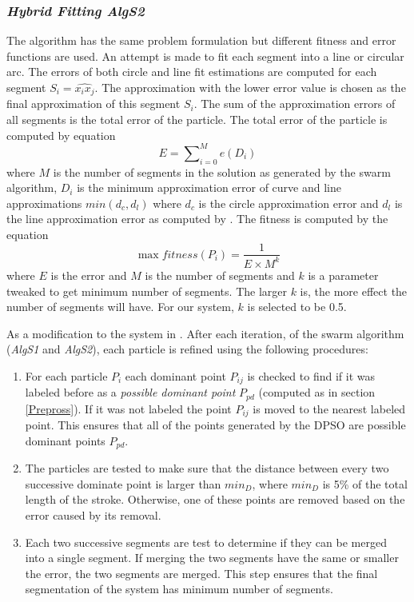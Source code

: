 \documentclass[preprint,1p,times,review]{elsarticle}
\begin{document}
 \subsubsection{\textit{Hybrid Fitting \textsl{AlgS2}}}
The algorithm has the same problem formulation but different fitness and error
functions are used. An attempt is made to fit each segment into a line or
circular arc. The errors of both circle and line fit estimations are computed
for each segment $S_i=\widehat{x_ix_j}$. The approximation with the lower error
value is chosen as the final approximation of this segment
$S_i$\cite{CruveDivisionSwarm}. The sum of the approximation errors of all
segments is the total error of the particle.  The total error of the particle is
computed by equation %
 \begin{equation}
E=\sum\nolimits_{i = 0}^M e(D_i)
\label{eq:errorSwarm2}
\end{equation}where $M$ is the number of segments in the solution as generated
by the swarm algorithm, $D_i$ is the minimum approximation error of curve and
line approximations $min(d_c,d_l)$ where $d_c$ is the circle approximation error
and $d_l$ is the line approximation error as computed by
\cite{CruveDivisionSwarm}.  The fitness is computed by the equation
\begin{equation}
\max fitness(P_i ) = \frac{1}{{E \times M^k }}
\label{eq:fitnessSwarm2}
\end{equation} where $E$ is the error and $M$ is the number of segments and $k$
is a parameter tweaked to get minimum number of segments. The larger $k$ is, the
more effect the number of segments will have. For our system, $k$ is selected to
be 0.5\cite{CruveDivisionSwarm}.

As a modification to the system in \cite{mypaper}. After each iteration, of the
swarm algorithm (\textsl{AlgS1} and \textsl{AlgS2}), each particle is refined
using the following procedures:
\begin{enumerate}
	\item For each particle $P_i$ each dominant point $P_{ij}$ is checked to
find if it was labeled before as a \textit{possible dominant point} $P_{pd}$
(computed as in section \ref{Prepross}). If it was not labeled the point
$P_{ij}$ is moved to the nearest labeled point. This ensures that all of the
points generated by the DPSO are possible dominant points $P_{pd}$.
	\item The particles are tested to make sure that the distance between
every two successive dominate point is larger than $min_D$, where $min_D$ is 5\%
of the total length of the stroke.  Otherwise, one of these points are removed
based on the error caused by its removal.
	\item Each two successive segments are test to determine if they can be
merged into a single segment. If merging the two segments have the same or
smaller the error, the two segments are merged. This step ensures that the final
segmentation of the system has minimum number of segments.
\end{enumerate}
\end{document}
